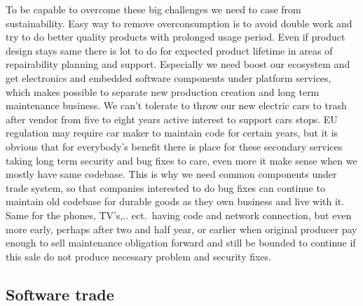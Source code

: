 To be capable to overcome these big challenges we need to case from
sustainability. Easy way to remove overconsumption is to avoid double work
and try to do better quality products with prolonged usage period. Even if
product design stays same there is lot to do for expected product lifetime
in areas of repairability planning and support. Especially we need boost our
ecosystem and get electronics and embedded software components under platform
services, which makes possible to separate new production creation and long
term maintenance business. We can't tolerate to throw our new electric cars to
trash after vendor from five to eight years active interest to support cars
stops. EU regulation may require car maker to maintain code for certain years,
but it is obvious that for everybody's benefit there is place for these
secondary services taking long term security and bug fixes to care, even more
it make sense when we mostly have same codebase. This is why we need common
components under trade system, so that companies interested to do bug fixes
can continue to maintain old codebase for durable goods as they own business
and live with it. Same for the phones, TV's,.. ect.\ having code and
network connection, but even more early, perhaps after two and half year, or
earlier when original producer pay enough to sell maintenance obligation
forward and still be bounded to continue if this sale do not produce
necessary problem and security fixes.

\subsection{Software trade}\label{software_trade}

